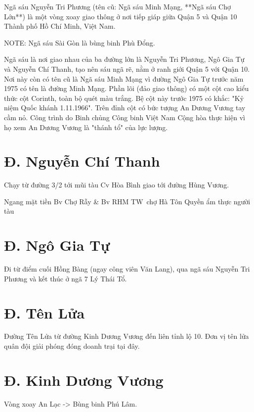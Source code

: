 Ngã sáu Nguyễn Tri Phương (tên cũ: Ngã sáu Minh Mạng, **Ngã sáu Chợ Lớn**) là một vòng xoay giao thông ở nơi tiếp giáp giữa Quận 5 và Quận 10 Thành phố Hồ Chí Minh, Việt Nam.

NOTE: Ngã sáu Sài Gòn là bùng binh Phù Đổng.

Ngã sáu là nơi giao nhau của ba đường lớn là Nguyễn Tri Phương, Ngô Gia Tự và Nguyễn Chí Thanh, tạo nên sáu ngã rẽ, nằm ở ranh giới Quận 5 với Quận 10. Nơi này còn có tên cũ là Ngã sáu Minh Mạng vì đường Ngô Gia Tự trước năm 1975 có tên là đường Minh Mạng. Phần lõi (đảo giao thông) có một cột cao kiểu thức cột Corinth, toàn bộ quét màu trắng. Bệ cột này trước 1975 có khắc: "Kỷ niệm Quốc khánh 1.11.1966". Trên đỉnh cột có bức tượng An Dương Vương tay cầm nỏ. Công trình do Binh chủng Công binh Việt Nam Cộng hòa thực hiện vì họ xem An Dương Vương là "thánh tổ" của lực lượng.

\section{Đ. Nguyễn Chí Thanh}

Chạy từ đường 3/2 tới mũi tàu Cv Hòa Bình giao tới đường Hùng Vương.

Ngang mặt tiền Bv Chợ Rẫy \& Bv RHM TW\
chợ Hà Tôn Quyền ẩm thực người tàu

\section{Đ. Ngô Gia Tự}

Đi từ điểm cuối Hồng Bàng (ngay công viên Văn Lang), qua ngã sáu Nguyễn Tri Phương và kết thúc ở ngã 7 Lý Thái Tổ.

\section{Đ. Tên Lửa}

Đường Tên Lửa từ đường Kinh Dương Vương đến liên tỉnh lộ 10. Đơn vị tên lửa quân đội giải phóng đóng doanh trại tại đây.

\section{Đ. Kinh Dương Vương}

Vòng xoay An Lạc -> Bùng binh Phú Lâm.


